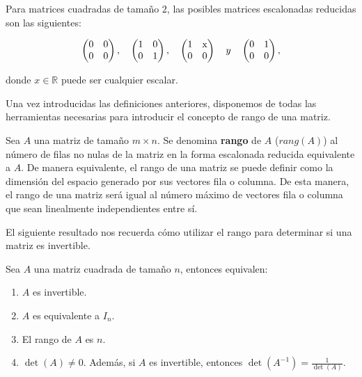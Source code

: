 \begin{ejemplo}
    Para matrices cuadradas de tamaño $2$, las posibles matrices escalonadas reducidas son las siguientes:

    \[
        \begin{pmatrix} 0 & 0 \\ 0 & 0 \end{pmatrix}, \quad
        \begin{pmatrix} 1 & 0 \\ 0 & 1 \end{pmatrix}, \quad
        \begin{pmatrix} 1 & $x$ \\ 0 & 0 \end{pmatrix} \quad y \quad
        \begin{pmatrix} 0 & 1 \\ 0 & 0
        \end{pmatrix},
    \]

    donde $x \in \mathbb{R}$ puede ser cualquier escalar.
\end{ejemplo}

Una vez introducidas las definiciones anteriores, disponemos de todas las herramientas necesarias para introducir el concepto de rango de una matriz.

\begin{definicion}
    Sea $A$ una matriz de tamaño $m \times n$. Se denomina \textbf{rango} de $A$ ($rang(A)$) al número de filas no nulas de la matriz en la forma escalonada reducida equivalente a $A$. De manera equivalente, el rango de una matriz se puede definir como la dimensión del espacio generado por sus vectores fila o columna. De esta manera, el rango de una matriz será igual al número máximo de vectores fila o columna que sean linealmente independientes entre sí.
\end{definicion}

El siguiente resultado nos recuerda cómo utilizar el rango para determinar si una matriz es invertible.

\begin{proposicion}
    Sea $A$ una matriz cuadrada de tamaño $n$, entonces equivalen:

    \begin{enumerate}
        \item $A$ es invertible.
        \item $A$ es equivalente a $I_n$.
        \item El rango de $A$ es $n$.
        \item $\det(A) \neq 0$. Además, si $A$ es invertible, entonces $\det(A^{-1})=\frac{1}{\det(A)}$.
    \end{enumerate}
\end{proposicion}

